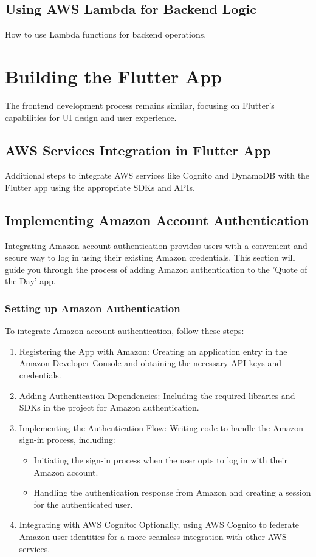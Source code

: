 \documentclass{book}
\begin{document}
\subsection{Using AWS Lambda for Backend Logic}
How to use Lambda functions for backend operations.

\section{Building the Flutter App}
The frontend development process remains similar, focusing on Flutter's capabilities for UI design and user experience.

\subsection{AWS Services Integration in Flutter App}
Additional steps to integrate AWS services like Cognito and DynamoDB with the Flutter app using the appropriate SDKs and APIs.

\subsection{Implementing Amazon Account Authentication}
Integrating Amazon account authentication provides users with a convenient and secure way to log in using their existing Amazon credentials. This section will guide you through the process of adding Amazon authentication to the 'Quote of the Day' app.

\subsubsection{Setting up Amazon Authentication}
To integrate Amazon account authentication, follow these steps:
\begin{enumerate}
    \item Registering the App with Amazon: Creating an application entry in the Amazon Developer Console and obtaining the necessary API keys and credentials.
    \item Adding Authentication Dependencies: Including the required libraries and SDKs in the project for Amazon authentication.
    \item Implementing the Authentication Flow: Writing code to handle the Amazon sign-in process, including:
    \begin{itemize}
        \item Initiating the sign-in process when the user opts to log in with their Amazon account.
        \item Handling the authentication response from Amazon and creating a session for the authenticated user.
    \end{itemize}
    \item Integrating with AWS Cognito: Optionally, using AWS Cognito to federate Amazon user identities for a more seamless integration with other AWS services.
\end{enumerate}
\end{document}
